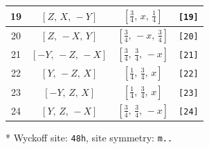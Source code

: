 \documentclass[fleqn,8pt]{jsarticle}
\begin{document}
\begin{longtable}{cccc}
19 & $\left[ Z,\, X,\, - Y \right]$ & $\left[ \frac{3}{4},\, x,\, \frac{1}{4} \right]$ & {\tt [19]} \\ \hline
20 & $\left[ Z,\, - X,\, Y \right]$ & $\left[ \frac{3}{4},\, - x,\, \frac{3}{4} \right]$ & {\tt [20]} \\ \hline
21 & $\left[ - Y,\, - Z,\, - X \right]$ & $\left[ \frac{3}{4},\, \frac{3}{4},\, - x \right]$ & {\tt [21]} \\ \hline
22 & $\left[ Y,\, - Z,\, X \right]$ & $\left[ \frac{1}{4},\, \frac{3}{4},\, x \right]$ & {\tt [22]} \\ \hline
23 & $\left[ - Y,\, Z,\, X \right]$ & $\left[ \frac{1}{4},\, \frac{3}{4},\, x \right]$ & {\tt [23]} \\ \hline
24 & $\left[ Y,\, Z,\, - X \right]$ & $\left[ \frac{3}{4},\, \frac{3}{4},\, - x \right]$ & {\tt [24]} \\
\end{longtable}
* Wyckoff site: {\tt 48h}, site symmetry: {\tt m..}
\renewcommand{\arraystretch}{1.2}
\end{document}
